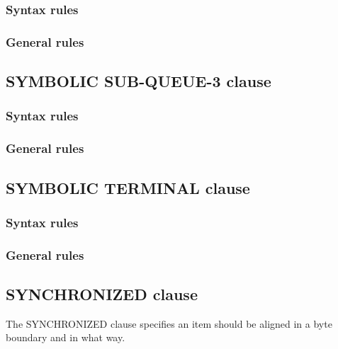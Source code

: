 \subsubsection{Syntax rules}

\subsubsection{General rules}

\subsection{SYMBOLIC SUB-QUEUE-3 clause}

\begin{syntax}[\deletedcolour]
\end{syntax}

\subsubsection{Syntax rules}

\subsubsection{General rules}

\subsection{SYMBOLIC TERMINAL clause}

\begin{syntax}[\deletedcolour]
\end{syntax}

\subsubsection{Syntax rules}

\subsubsection{General rules}

\subsection{SYNCHRONIZED clause}

The SYNCHRONIZED clause specifies an item should be aligned in a byte boundary and in what way.

